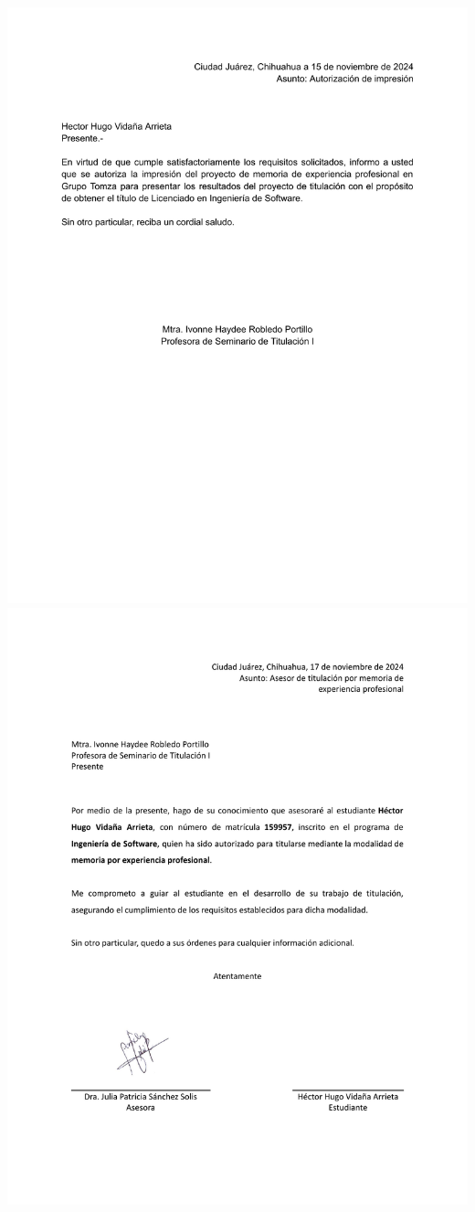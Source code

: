 \documentclass[final, fmstyle, 12pt]{article}
\begin{document}
\newpage
\begin{center}

\includegraphics[scale=0.8]{Imagenes/Pdf/Carta de maestro.pdf}
\includegraphics[scale=0.8]{Imagenes/Pdf/Carta asesor.pdf}

\end{center}
\end{document}
